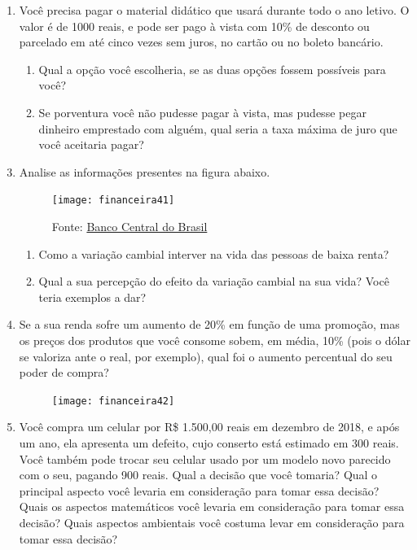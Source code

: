 \begin{enumerate}
\item Você precisa pagar o material didático que usará durante todo o ano letivo. O valor é de 1000 reais, e pode ser pago à vista com 10\% de desconto ou parcelado em até cinco vezes sem juros, no cartão ou no boleto bancário. 
  \begin{enumerate}
  \item Qual a opção você escolheria, se as duas opções fossem possíveis para você?
  \item Se porventura você não pudesse pagar à vista, mas pudesse pegar dinheiro emprestado com alguém, qual seria a taxa máxima de juro que você aceitaria pagar?
  \end{enumerate}
\end{enumerate}
\clearpage

\begin{enumerate}
\setcounter{enumi}{2}
\item Analise as informações presentes na figura abaixo.
\begin{figure}[H]
\centering

\texttt{[image: financeira41]}
\caption{Fonte: \href{https://www.bcb.gov.br/}{Banco Central do Brasil}}
\end{figure}
  \begin{enumerate}
    \item Como a variação cambial interver na vida das pessoas de baixa renta?
    \item Qual a sua percepção do efeito da variação cambial na sua vida? Você teria exemplos a dar?
  \end{enumerate}

\item Se a sua renda sofre um aumento de 20\% em função de uma promoção, mas os preços dos produtos que você consome sobem, em média, 10\% (pois o dólar se valoriza ante o real, por exemplo), qual foi o aumento percentual do seu poder de compra?

\begin{figure}[H]
\centering

\texttt{[image: financeira42]}
\end{figure}

\item Você compra um celular por R\$ 1.500,00 reais em dezembro de 2018, e após um ano, ela apresenta um defeito, cujo conserto está estimado em 300 reais. Você também pode trocar seu celular usado por um modelo novo parecido com o seu, pagando 900 reais. Qual a decisão que você tomaria? Qual o principal aspecto você levaria em consideração para tomar essa decisão? Quais os aspectos matemáticos você levaria em consideração para tomar essa decisão? Quais aspectos ambientais você costuma levar em consideração para tomar essa decisão?
\end{enumerate}

